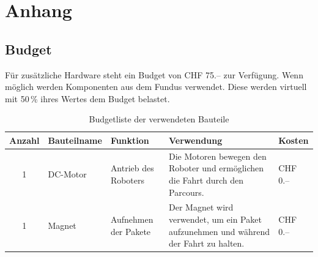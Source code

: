 \documentclass[11pt,a4paper]{article}
\begin{document}
	
	
	\appendix
	\section{Anhang}
	\noindent
	\subsection{Budget}
	Für zusätzliche Hardware steht ein Budget von CHF 75.-- zur Verfügung. Wenn möglich werden Komponenten aus dem Fundus verwendet. Diese werden virtuell mit 50\,\% ihres Wertes dem Budget belastet.
	
	\begin{table}[H]
		\centering
		\caption{Budgetliste der verwendeten Bauteile}
		\begin{tabularx}{\textwidth}{|c|l|X|X|X|}
			\hline
			\textbf{Anzahl} & \textbf{Bauteilname} & \textbf{Funktion} & \textbf{Verwendung} & \textbf{Kosten} 
			\\
			\hline
			
			1 & 
			DC-Motor & 
			Antrieb des Roboters & 
			Die Motoren bewegen den Roboter und ermöglichen die Fahrt durch den Parcours. & 
			CHF 0.-- \\
			\hline
			
			1 & 
			Magnet & 
			Aufnehmen der Pakete & 
			Der Magnet wird verwendet, um ein Paket aufzunehmen und während der Fahrt zu halten. & 
			CHF 0.-- \\
			\hline
			
		\end{tabularx}
	\end{table}
		
		
		\clearpage
		
		
		\clearpage
		
	
		\clearpage
		
	
\end{document}
